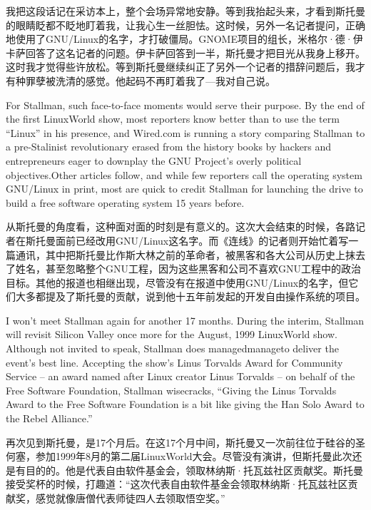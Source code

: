 \ifdefined\chs
我把这段话记在采访本上，整个会场异常地安静。等到我抬起头来，才看到斯托曼的眼睛眨都不眨地盯着我，让我心生一丝胆怯。这时候，另外一名记者提问，正确地使用了GNU/Linux的名字，才打破僵局。GNOME项目的组长，米格尔·德·伊卡萨回答了这名记者的问题。伊卡萨回答到一半，斯托曼才把目光从我身上移开。这时我才觉得些许放松。等到斯托曼继续纠正了另外一个记者的措辞问题后，我才有种罪孽被洗清的感觉。他起码不再盯着我了---我对自己说。
\fi

\ifdefined\eng
For Stallman, such face-to-face moments would serve their purpose. By the end of the first LinuxWorld show, most reporters know better than to use the term ``Linux'' in his presence, and Wired.com is running a story comparing Stallman to a pre-Stalinist revolutionary erased from the history books by hackers and entrepreneurs eager to downplay the GNU Project's overly political objectives.\ifdefined\vtwo{}\fi  Other articles follow, and while few reporters call the operating system GNU/Linux in print, most are quick to credit Stallman for launching the drive to build a free software operating system 15 years before.
\fi

\ifdefined\chs
从斯托曼的角度看，这种面对面的时刻是有意义的。这次大会结束的时候，各路记者在斯托曼面前已经改用GNU/Linux这名字。而《连线》的记者则开始忙着写一篇通讯，其中把斯托曼比作斯大林之前的革命者，被黑客和各大公司从历史上抹去了姓名，甚至忽略整个GNU工程，因为这些黑客和公司不喜欢GNU工程中的政治目标\ifdefined\vtwo{}。\fi 其他的报道也相继出现，尽管没有在报道中使用GNU/Linux的名字，但它们大多都提及了斯托曼的贡献，说到他十五年前发起的开发自由操作系统的项目。
\fi

\ifdefined\eng
I won't meet Stallman again for another 17 months. During the interim, Stallman will revisit Silicon Valley once more for the August, 1999 LinuxWorld show. Although not invited to speak, Stallman does \ifdefined\vone managed\fi\ifdefined\vtwo manage\fi to deliver the event's best line. Accepting the show's Linus Torvalds Award for Community Service -- an award named after Linux creator Linus Torvalds -- on behalf of the Free Software Foundation, Stallman wisecracks, ``Giving the Linus Torvalds Award to the Free Software Foundation is a bit like giving the Han Solo Award to the Rebel Alliance.''
\fi

\ifdefined\chs
再次见到斯托曼，是17个月后。在这17个月中间，斯托曼又一次前往位于硅谷的圣何塞，参加1999年8月的第二届LinuxWorld大会。尽管没有演讲，但斯托曼此次还是有目的的。他是代表自由软件基金会，领取林纳斯·托瓦兹社区贡献奖。斯托曼接受奖杯的时候，打趣道：``这次代表自由软件基金会领取林纳斯·托瓦兹社区贡献奖，感觉就像唐僧代表师徒四人去领取悟空奖。''
\fi

